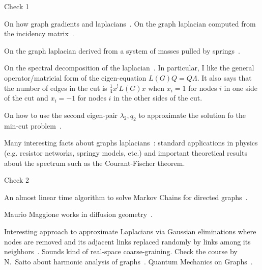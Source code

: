 \documentclass{beamer}
\begin{document}
\begin{frame}{Check 1}

On how graph gradients and laplacians~\cite{davies2016what}.
On the graph laplacian computed from the incidency matrix~\cite{udacity2016spectral1}.

On the graph laplacian derived from a system of masses pulled by springs~\cite{udacity2016spectral2}.

On the spectral decomposition of the laplacian~\cite{udacity2016spectral3}.
In particular, I like the general operator/matricial form of the eigen-equation
$L(G)Q=Q\Lambda$.
It also says that the number of edges in the cut is $\frac{1}{4}x^!L(G)x$ when $x_i=1$ for nodes $i$ in one side of the cut and $x_i=-1$ for nodes $i$ in the other sides of the cut.

On how to use the second eigen-pair $\lambda_2,q_2$ to approximate the solution fo the min-cut problem~\cite{udacity2016spectral4}.

Many interesting facts about graphs laplacians~\cite{speilman2017laplacian}: standard applications in physics (e.g. resistor networks, springy models, etc.) and important theoretical results about the spectrum such as the Courant-Fischer theorem.

\end{frame}


\begin{frame}{Check 2}

An almost linear time algorithm to solve Markov Chains for directed graphs~\cite{1611.00755,1811.10722}.

Maurio Maggione works in diffusion geometry~\cite{maggioni2020homepage}.

Interesting approach to approximate Laplacians via Gaussian eliminations where nodes are removed and its adjacent links replaced randomly by links among its neighbors~\cite{1605.02353}.
Sounds kind of real-space coarse-graining.
Check the course by N.~Saito about harmonic analysis of graphs~\cite{saito2019harmonic}.
Quantum Mechanics on Graphs~\cite{mnev2016graph}.

\end{frame}

\end{document}
